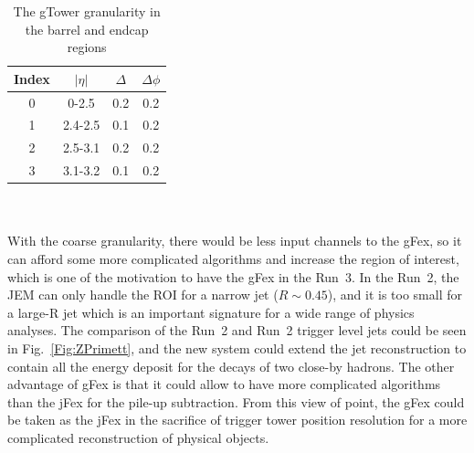 \begin{table}[h]
	\caption{The gTower granularity in the barrel and endcap regions}
	\renewcommand{\arraystretch}{1.3}
	\centering
	\begin{tabular}{| c | c | c | c | }
		\hline
		\hline
		Index      &    $|\eta|$        &     $\Delta$     & $\Delta\phi$   \\
		\hline
		0          &     0-2.5          & 0.2                          &  0.2                          \\
		\hline
		1          &     2.4-2.5           & 0.1                          &  0.2                         \\
		\hline
		2      &     2.5-3.1       & 0.2                      &  0.2                       \\
		\hline 
		3      &     3.1-3.2       & 0.1                      &  0.2                       \\
		\hline
		\hline
	\end{tabular}
	\label{Tab:granularity_gT}
\end{table}
\noindent
\\
\\With the coarse granularity, there would be less input channels to the gFex, so it can afford some more complicated algorithms and increase the region of interest, which is one of the motivation to have the gFex in the Run~3. In the Run~2, the JEM can only handle the ROI for a narrow jet ($R\sim 0.45$), and it is too small for a large-R jet which is an important signature for a wide range of physics analyses. The comparison of the Run~2 and Run~2 trigger level jets could be seen in Fig.~\ref{Fig:ZPrimett}, and the new system could extend the jet reconstruction to contain all the energy deposit for the decays of two close-by hadrons. The other advantage of gFex is that it could allow to have more complicated algorithms than the jFex for the pile-up subtraction. From this view of point, the gFex could be taken as the jFex in the sacrifice of trigger tower position resolution for a more complicated reconstruction of physical objects. 
